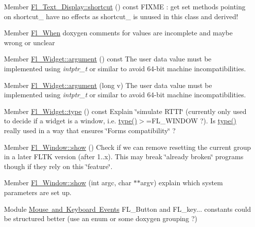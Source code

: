 \begin{DoxyRefList}
\item[Member \mbox{\hyperlink{class_fl___text___display_a98f01dd6b8be0522e54bccf0f3587d47}{Fl\+\_\+\+Text\+\_\+\+Display::shortcut}} () const]\label{todo__todo000017}%
%
F\+I\+X\+ME \+: get set methods pointing on shortcut\+\_\+ have no effects as shortcut\+\_\+ is unused in this class and derived!  
\item[Member \mbox{\hyperlink{_enumerations_8_h_adaaa8b52b78abf3ccce4787b112e6665}{Fl\+\_\+\+When}} ]\label{todo__todo000001}%
%
doxygen comments for values are incomplete and maybe wrong or unclear  
\item[Member \mbox{\hyperlink{class_fl___widget_a217b954bb7a3c053850de3234fce3e62}{Fl\+\_\+\+Widget::argument}} () const]\label{todo__todo000023}%
%
The user data value must be implemented using {\itshape intptr\+\_\+t} or similar to avoid 64-\/bit machine incompatibilities.  
\item[Member \mbox{\hyperlink{class_fl___widget_a3eb3b128cbad3f579a66cab813470442}{Fl\+\_\+\+Widget::argument}} (long v)]\label{todo__todo000024}%
%
The user data value must be implemented using {\itshape intptr\+\_\+t} or similar to avoid 64-\/bit machine incompatibilities.  
\item[Member \mbox{\hyperlink{class_fl___widget_adda2e8f162b3ea0332eb8d762350bbd5}{Fl\+\_\+\+Widget::type}} () const]\label{todo__todo000022}%
%
Explain \char`\"{}simulate R\+T\+T\+I\char`\"{} (currently only used to decide if a widget is a window, i.\+e. \mbox{\hyperlink{class_fl___widget_adda2e8f162b3ea0332eb8d762350bbd5}{type()}}$>$=F\+L\+\_\+\+W\+I\+N\+D\+OW ?). Is \mbox{\hyperlink{class_fl___widget_adda2e8f162b3ea0332eb8d762350bbd5}{type()}} really used in a way that ensures \char`\"{}\+Forms compatibility\char`\"{} ?  
\item[Member \mbox{\hyperlink{class_fl___window_a908afc4420fd505e958f6ed394a86acc}{Fl\+\_\+\+Window::show}} ()]\label{todo__todo000025}%
%
Check if we can remove resetting the current group in a later F\+L\+TK version (after 1..\+x). This may break \char`\"{}already broken\char`\"{} programs though if they rely on this \char`\"{}feature\char`\"{}. 
\item[Member \mbox{\hyperlink{class_fl___window_a0d75dfcdc8fb797f9247482da1e0152b}{Fl\+\_\+\+Window::show}} (int argc, char $\ast$$\ast$argv)]\label{todo__todo000026}%
%
explain which system parameters are set up. 
\item[Module \mbox{\hyperlink{_enumerations_8_h_amgrp010740e6371ef70b76e732e3526cbcdc}{Mouse and Keyboard Events}} ]\label{todo__todo000002}%
%
F\+L\+\_\+\+Button and F\+L\+\_\+key... constants could be structured better (use an enum or some doxygen grouping ?)
\end{DoxyRefList}